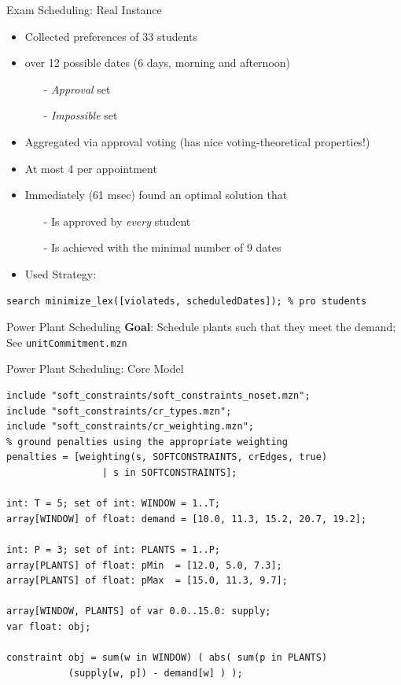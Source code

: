 \documentclass[handout,10pt,xcolor={dvipsnames},fleqn]{beamer}
\begin{document}
\begin{frame}[fragile]{Exam Scheduling: Real Instance}

\begin{itemize}
\item Collected preferences of 33 students
\item over 12 possible dates (6 days, morning and afternoon)
\begin{itemize}
\item[-] \emph{Approval} set 
\item[-] \emph{Impossible} set 
\end{itemize}

\vspace*{2ex}

\item Aggregated via \alert{approval voting} (has nice voting-theoretical properties!)
\item At most 4 per appointment

\item Immediately (61 msec) found an optimal solution that
\begin{itemize}
\item[-] Is approved by \emph{every} student
\item[-] Is achieved with the minimal number of 9 dates 
\end{itemize}
\item Used Strategy:
\end{itemize}
\begin{lstlisting}
search minimize_lex([violateds, scheduledDates]); % pro students
\end{lstlisting}
\end{frame}

\begin{frame}[fragile]{Power Plant Scheduling}
\textbf{Goal}: Schedule plants such that they meet the \alert{demand}; See \texttt{unitCommitment.mzn}


\end{frame}

\begin{frame}[fragile]{Power Plant Scheduling: Core Model}
\begin{lstlisting}
include "soft_constraints/soft_constraints_noset.mzn";
include "soft_constraints/cr_types.mzn";
include "soft_constraints/cr_weighting.mzn";
% ground penalties using the appropriate weighting
penalties = [weighting(s, SOFTCONSTRAINTS, crEdges, true) 
                 | s in SOFTCONSTRAINTS];

int: T = 5; set of int: WINDOW = 1..T;
array[WINDOW] of float: demand = [10.0, 11.3, 15.2, 20.7, 19.2];

int: P = 3; set of int: PLANTS = 1..P;
array[PLANTS] of float: pMin  = [12.0, 5.0, 7.3];
array[PLANTS] of float: pMax  = [15.0, 11.3, 9.7];

array[WINDOW, PLANTS] of var 0.0..15.0: supply; 
var float: obj;

constraint obj = sum(w in WINDOW) ( abs( sum(p in PLANTS) 
           (supply[w, p]) - demand[w] ) );

\end{lstlisting}
\end{frame}
\end{document}
